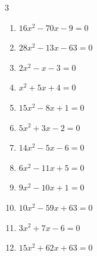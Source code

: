 \begin{multicols}{3}
\begin{enumerate}

  \item $16x^{2}-70x-9=0$


  \item $28x^{2}-13x-63=0$


  \item $2x^{2}-x-3=0$


  \item $x^{2}+5x+4=0$

        \phantom{$\displaystyle x=-4,\; -1$}

  \item $15x^{2}-8x+1=0$


  \item $5x^{2}+3x-2=0$


\columnbreak %

\resetques

  \item $14x^{2}-5x-6=0$


  \item $6x^{2}-11x+5=0$


  \item $9x^{2}-10x+1=0$


  \item $10x^{2}-59x+63=0$


  \item $3x^{2}+7x-6=0$


  \item $15x^{2}+62x+63=0$



\end{enumerate}
\end{multicols}
